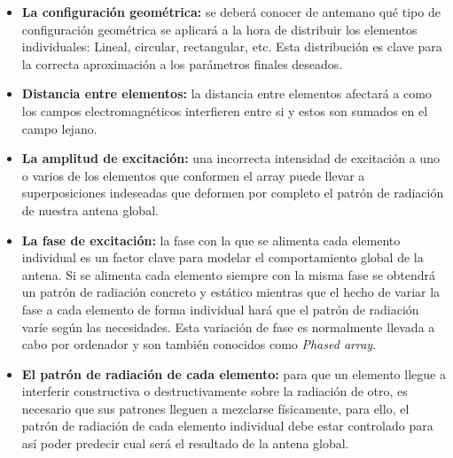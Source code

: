 \begin{itemize}
\item \textbf{La configuración geométrica: }se deberá conocer de antemano qué tipo de configuración geométrica se aplicará a la hora de distribuir los elementos individuales: Lineal, circular, rectangular, etc. Esta distribución es clave para la correcta aproximación a los parámetros finales deseados.

\item \textbf{Distancia entre elementos: }la distancia entre elementos  afectará a como los campos electromagnéticos interfieren entre si y estos son sumados en el campo lejano.

\item \textbf{La amplitud de excitación: }una incorrecta intensidad de excitación a uno o varios de los elementos que conformen el array puede llevar a superposiciones indeseadas que deformen por completo el patrón de radiación de nuestra antena global.

\item \textbf{La fase de excitación: }la fase con la que se alimenta cada elemento individual es un factor clave para modelar el comportamiento global de la antena. Si se alimenta cada elemento siempre con la misma fase se obtendrá un patrón de radiación concreto y estático mientras que el hecho de variar la fase a cada elemento de forma individual hará que el patrón de radiación varíe según las necesidades. Esta variación de fase es normalmente llevada a cabo por ordenador y son también conocidos como \textit{Phased array}.

\item \textbf{El patrón de radiación de cada elemento: }para que un elemento llegue a interferir constructiva o destructivamente sobre la radiación de otro, es necesario que sus patrones lleguen a mezclarse físicamente, para ello, el patrón de radiación de cada elemento individual debe estar controlado para así poder predecir cual será el resultado de la antena global.
\end{itemize}

